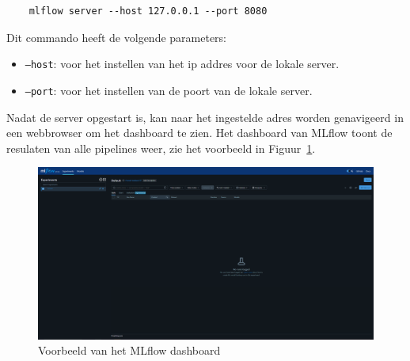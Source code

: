 \begin{verbatim}
    mlflow server --host 127.0.0.1 --port 8080
\end{verbatim}

Dit commando heeft de volgende parameters:

\begin{itemize}
    \item \texttt{--host}: voor het instellen van het ip addres voor de lokale server.
    \item \texttt{--port}: voor het instellen van de poort van de lokale server.
\end{itemize}

Nadat de server opgestart is, kan naar het ingestelde adres worden genavigeerd in een webbrowser om het dashboard te zien. Het dashboard van MLflow toont de resulaten van alle pipelines weer, zie het voorbeeld in Figuur~\ref{fig:mlflow_dashboard}.

\begin{figure}
    \centering
    \includegraphics[width=0.9\linewidth]{graphics/mlflow_dashboard.PNG}
    \caption{Voorbeeld van het MLflow dashboard}
    \label{fig:mlflow_dashboard}
\end{figure}